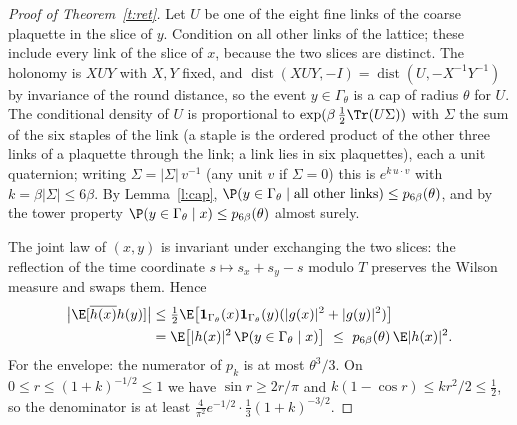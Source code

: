 \begin{proof}[Proof of Theorem~\ref{t:ret}]
Let $U$ be one of the eight fine links of the coarse plaquette in the slice of $y$. Condition on all other
links of the lattice; these include every link of the slice of $x$, because the two slices are distinct. The
holonomy is $XUY$ with $X,Y$ fixed, and $\operatorname{dist}(XUY,-I)=\operatorname{dist}(U,-X^{-1}Y^{-1})$ by
invariance of the round distance, so the event $y\in \Gamma_\theta$ is a cap of radius $\theta$ for $U$. The
conditional density of $U$ is proportional to $\exp(\beta\,\tfrac12\Tr(U\Sigma))$ with $\Sigma$ the sum of the
six staples of the link (a staple is the ordered product of the other three links of a plaquette through the
link; a link lies in six plaquettes), each a unit quaternion; writing $\Sigma=|\Sigma|\,v^{-1}$ (any unit $v$ if $\Sigma=0$) this is $e^{k\,u\cdot v}$ with
$k=\beta|\Sigma|\le6\beta$. By Lemma~\ref{l:cap}, $\P(y\in \Gamma_\theta\mid\text{all other links})\le
p_{6\beta}(\theta)$, and by the tower property $\P(y\in \Gamma_\theta\mid x)\le p_{6\beta}(\theta)$ almost surely.

The joint law of $(x,y)$ is invariant under exchanging the two slices: the reflection of the time coordinate
$s\mapsto s_x+s_y-s$ modulo $T$ preserves the Wilson measure and swaps them. Hence
\begin{align*}
\big|\E[\overline{h(x)}h(y)]\big|&\le\tfrac12\E\big[\mathbf 1_{\Gamma_\theta}(x)\mathbf 1_{\Gamma_\theta}(y)(|g(x)|^2+|g(y)|^2)\big]\\
&=\E\big[|h(x)|^2\,\P(y\in \Gamma_\theta\mid x)\big]\ \le\ p_{6\beta}(\theta)\,\E|h(x)|^2 .
\end{align*}
For the envelope: the numerator of $p_k$ is at most $\theta^3/3$. On $0\le r\le(1+k)^{-1/2}\le1$ we have
$\sin r\ge2r/\pi$ and $k(1-\cos r)\le kr^2/2\le\tfrac12$, so the denominator is at least
$\tfrac{4}{\pi^2}e^{-1/2}\cdot\tfrac13(1+k)^{-3/2}$.
\end{proof}

